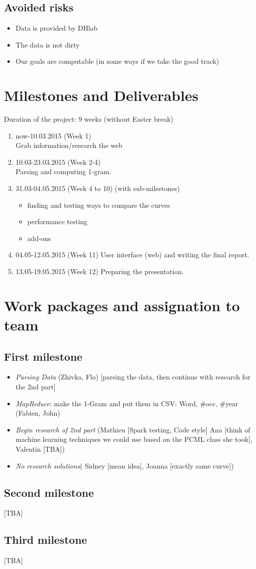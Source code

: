 \documentclass{article}
\begin{document}
\subsection{Avoided risks}
\begin{itemize}
\item Data is provided by DHlab
\item The data is not dirty
\item Our goals are computable (in some ways if we take the good track)
\end{itemize}
\section{Milestones and Deliverables}
Duration of the project: 9 weeks (without Easter break)
\begin{enumerate}
\item now-10.03.2015 (Week 1)\\
Grab information/research the web
\item 10.03-23.03.2015 (Week 2-4)\\
Parsing and computing 1-gram.
\item 31.03-04.05.2015 (Week 4 to 10) (with sub-milestones) \\
\begin{itemize}
\item finding and testing ways to compare the curves 
\item performance testing 
\item add-ons
\end{itemize}
\item 04.05-12.05.2015 (Week 11) 
User interface (web) and writing the final report.
\item 13.05-19.05.2015 (Week 12)
Preparing the presentation.


\end{enumerate}

\section{Work packages and assignation to team}
\subsection{First milestone}
\begin{itemize}
\item \textit{Parsing Data} (Zhivka, Flo) [parsing the data, then continue with research for the 2nd part]
\item\textit{ MapReduce}: make the 1-Gram and put them in CSV: Word, $\#$occ, $\#$year (Fabien, John)
\item \textit{Begin research of 2nd part} (Mathieu [Spark testing, Code style] Ana [think of machine learning techniques we could use based on the PCML class she took], Valentin [TBA])
\item \textit{No research solutions}( Sidney [mean idea], Joanna [exactly same curve])
\end{itemize}
\subsection{Second milestone}
[TBA]
\subsection{Third milestone}
[TBA]
\end{document}
